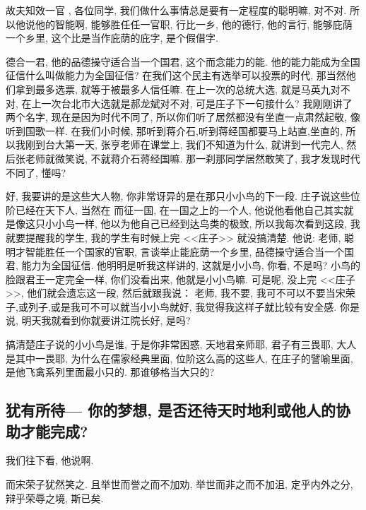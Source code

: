 \documentclass[11pt]{article}
\begin{document}
{\color{blue} 故夫知效一官 }, 各位同学, 我们做什么事情总是要有一定程度的聪明嘛, 对不对. 所以他说他的智能啊, 能够胜任任一官职, {\color{blue} 行比一乡}, 他的德行, 他的言行, 能够庇荫一个乡里, 这个比是当作庇荫的庇字, 是个假借字. 

{\color{blue} 德合一君}, 他的品德操守适合当一个国君, 这个而念能力的能. 他的能力能成为全国征信什么叫做能力为全国征信? 在我们这个民主有选举可以投票的时代, 那当然他们拿到最多选票, 就等于被最多人信任嘛. 在上一次的总统大选, 就是马英九对不对, 在上一次台北市大选就是郝龙斌对不对, 可是庄子下一句接什么? 我刚刚讲了两个名字, 现在是因为时代不同了, 所以你们听了居然都没有坐直一点肃然起敬, 像听到国歌一样. 在我们小时候, 那听到蒋介石,听到蒋经国都要马上站直,坐直的, 所以我刚到台大第一天, 张亨老师在课堂上, 我们不知道为什么, 就讲到一代完人, 然后张老师就微笑说, 不就蒋介石蒋经国嘛. 那一刹那同学居然敢笑了, 我才发现时代不同了, 懂吗? 

好, 我要讲的是这些大人物, 你非常讶异的是在那只小小鸟的下一段. 庄子说这些位阶已经在天下人, 当然在{\color{blue} 而征一国}, 在一国之上的一个人, 他说他看他自己其实就是像这只小小鸟一样, 他以为他自己已经到达鸟类的极致, 所以我每次看到这段, 我就要提醒我的学生, 我的学生有时候上完 <<庄子>> 就没搞清楚. 他说: 老师, 聪明才智能胜任一个国家的官职, 言谈举止能庇荫一个乡里, 品德操守适合当一个国君, 能力为全国征信. 他明明是听我这样讲的, 这就是小小鸟, 你看, 不是吗? 小鸟的脸跟君王一定完全一样, 你们没看出来, 他就是小小鸟嘛. 可是呢, 没上完 <<庄子>>, 他们就会遗忘这一段, 然后就跟我说： 老师, 我不要, 我可不可以不要当宋荣子,或列子,或是我可不可以就当小小鸟就好, 我觉得我这样子就比较有安全感. 你是说, 明天我就看到你就要讲江院长好, 是吗? 

搞清楚庄子说的小小鸟是谁, 于是你非常困惑, 天地君亲师耶, 君子有三畏耶, 大人是其中一畏耶, 为什么在儒家经典里面, 位阶这么高的这些人, 在庄子的譬喻里面, 是他飞禽系列里面最小只的. 那谁够格当大只的? 

\subsection{\kaishu 犹有所待--- 你的梦想, 是否还待天时地利或他人的协助才能完成?}

我们往下看, 他说啊.

\begin{center}
	{\color{magenta} 而宋荣子犹然笑之. 且举世而誉之而不加劝, 举世而非之而不加沮, 定乎内外之分, 辩乎荣辱之境, 斯已矣.}
\end{center}

\vspace{-0.5cm}
\end{document}
